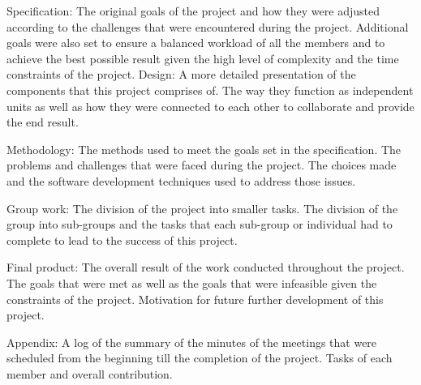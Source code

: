 \documentclass[a4paper,11pt]{article}
\begin{document}
Specification: The original goals of the project and how they were adjusted according to the challenges that were encountered during the project. Additional goals were also set to ensure a balanced workload of all the members and to achieve the best possible result given the high level of complexity and the time constraints of the project.
Design: A more detailed presentation of the components that this project comprises of. The way they function as independent units as well as how they were connected to each other to collaborate and provide the end result.

Methodology: The methods used to meet the goals set in the specification. The problems and challenges that were faced during the project. The choices made and the software development techniques used to address those issues.

Group work: The division of the project into smaller tasks. The division of the group into sub-groups and the tasks that each sub-group or individual had to complete to lead to the success of this project.

Final product: The overall result of the work conducted throughout the project. The goals that were met as well as the goals that were infeasible given the constraints of the project. Motivation for future further development of this project.

Appendix: A log of the summary of the minutes of the meetings that were scheduled from the beginning till the completion of the project. Tasks of each member and overall contribution.



{}

\end{document}
